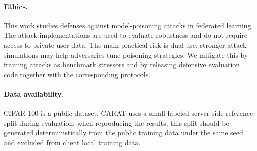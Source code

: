 \documentclass{article}
\begin{document}
\paragraph{Ethics.}
This work studies defenses against model-poisoning attacks in federated learning. The attack implementations are used to evaluate robustness and do not require access to private user data. The main practical risk is dual use: stronger attack simulations may help adversaries tune poisoning strategies. We mitigate this by framing attacks as benchmark stressors and by releasing defensive evaluation code together with the corresponding protocols.

\paragraph{Data availability.}
CIFAR-100 is a public dataset. CARAT uses a small labeled server-side reference split during evaluation; when reproducing the results, this split should be generated deterministically from the public training data under the same seed and excluded from client local training data.

\newpage

\end{document}
